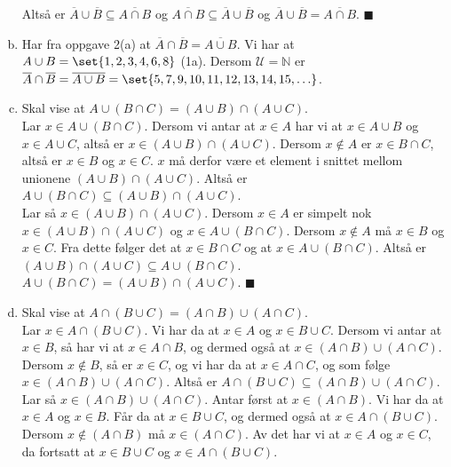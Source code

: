 \documentclass{article}
\begin{document}
\begin{enumerate}[(a)]
{        Altså er $\overline{A} \cup \overline{B} \subseteq \overline{A \cap B}$ og $\overline{A \cap B} \subseteq \overline{A} \cup \overline{B}$ og
        $\overline{A} \cup \overline{B} = \overline{A \cap B}$. $\blacksquare$
    }
    \item {
        Har fra oppgave 2(a) at $\overline{A} \cap \overline{B} = \overline{A \cup B}$. Vi har at $A \cup B = \set{1, 2, 3, 4, 6, 8}$ (1a).
        Dersom $\mathcal{U} = \mathbb{N}$ er $\overline{A} \cap \overline{B} = \overline{A \cup B} = \set{5, 7, 9, 10, 11, 12, 13, 14, 15, \ldots}$.
    }
    \item {
        Skal vise at $A \cup (B \cap C) = (A \cup B) \cap (A \cup C)$. \\
        Lar $x \in A \cup (B \cap C)$. Dersom vi antar at $x \in A$ har vi at $x \in A \cup B$ og $x \in A \cup C$,
        altså er $x \in (A \cup B) \cap (A \cup C)$. Dersom $x \notin A$ er $x \in B \cap C$, altså er $x \in B$ og $x \in C$. $x$ må derfor være et 
        element i snittet mellom unionene $(A \cup B) \cap (A \cup C)$. Altså er $A \cup (B \cap C) \subseteq (A \cup B) \cap (A \cup C)$. \\
        Lar så $x \in (A \cup B) \cap (A \cup C)$. Dersom $x \in A$ er simpelt nok $x \in (A \cup B) \cap (A \cup C)$ og $x \in A \cup (B \cap C)$. 
        Dersom $x \notin A$ må $x \in B$ og $x \in C$. Fra dette følger det at $x \in B \cap C$ og at $x \in A \cup (B \cap C)$. Altså er 
        $(A \cup B) \cap (A \cup C) \subseteq A \cup (B \cap C)$. \\
        $A \cup (B \cap C) = (A \cup B) \cap (A \cup C)$. $\blacksquare$
    }
    \item {
        Skal vise at $A \cap (B \cup C) = (A \cap B) \cup (A \cap C)$. \\
        Lar $x \in A \cap (B \cup C)$. Vi har da at $x \in A$ og $x \in B \cup C$. Dersom vi antar at 
        $x \in B$, så har vi at $x \in A \cap B$, og dermed også at $x \in (A \cap B) \cup (A \cap C)$. 
        Dersom $x \notin B$, så er $x \in C$, og vi har da at $x \in A \cap C$, og som følge $x \in (A \cap B) \cup (A \cap C)$.
        Altså er $A \cap (B \cup C) \subseteq (A \cap B) \cup (A \cap C)$. \\
        Lar så $x \in (A \cap B) \cup (A \cap C)$. Antar først at $x \in (A \cap B)$. Vi har da at $x \in A$ og $x \in B$.
        Får da at $x \in B \cup C$, og dermed også at $x \in A \cap (B \cup C)$. Dersom $x \notin (A \cap B)$ må $x \in (A \cap C)$.
        Av det har vi at $x \in A$ og $x \in C$, da fortsatt at $x \in B \cup C$ og $x \in A \cap (B \cup C)$.
}
\end{enumerate}
\end{document}
